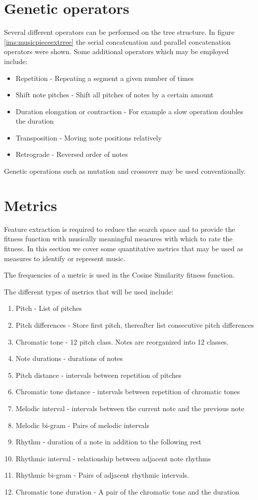 \section{Genetic operators}
Several different operators can be performed on the tree structure. In figure \ref{ims:musicpieceextrree} the serial concatenation and parallel concatenation operators were shown.
Some additional operators which may be employed include:
\begin{itemize}
\item Repetition - Repeating a segment a given number of times
\item Shift note pitches - Shift all pitches of notes by a certain amount
\item Duration elongation or contraction - For example a slow operation doubles the duration
\item Transposition - Moving note positions relatively
\item Retrograde - Reversed order of notes
\end{itemize}

Genetic operations such as mutation and crossover may be used conventionally.

\section{Metrics} \label{chap:metrics}
Feature extraction is required to reduce the search space and to provide the fitness function with musically meaningful measures with which to rate the fitness. In this section we cover some quantitative metrics that may be used as measures to identify or represent music.

The frequencies of a metric is used in the Cosine Similarity fitness function.

The different types of metrics that will be used include:
\begin{enumerate}
\item Pitch - List of pitches
\item Pitch differences - Store first pitch, thereafter list consecutive pitch differences
\item Chromatic tone - 12 pitch class. Notes are reorganized into 12 classes.
\item Note durations - durations of notes
\item Pitch distance - intervals between repetition of pitches
\item Chromatic tone distance - intervals between repetition of chromatic tones  
\item Melodic interval - intervals between the current note and the previous note
\item Melodic bi-gram - Pairs of melodic intervals
\item Rhythm - duration of a note in addition to the following rest
\item Rhythmic interval - relationship between adjacent note rhythms
\item Rhythmic bi-gram - Pairs of adjacent rhythmic intervals.
\item Chromatic tone duration - A pair of the chromatic tone and the duration
\end{enumerate}

